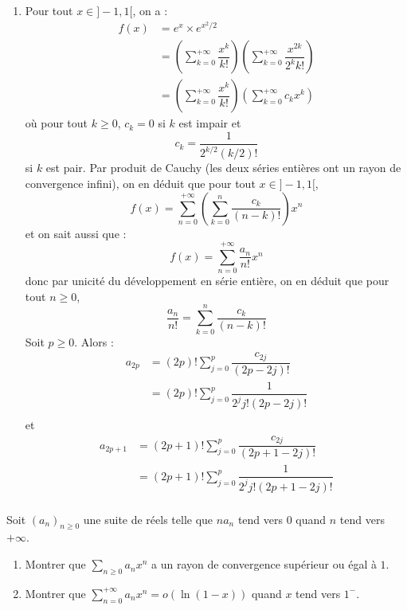 \documentclass[a4paper,twoside,french,11pt]{VcCours}
\begin{document}
\begin{enumerate}
\item Pour tout $x \in ]-1,1[$, on a :
\begin{align*}
f(x) & = e^x \times e^{x^2/2} \\
& = \left( \sum_{k=0}^{+ \infty} \dfrac{x^k}{k!} \right) \left( \sum_{k=0}^{+ \infty} \dfrac{x^{2k}}{2^k k!} \right)  \\
& = \left( \sum_{k=0}^{+ \infty} \dfrac{x^k}{k!} \right) \left( \sum_{k=0}^{+ \infty} c_k x^k \right)  
\end{align*}
où pour tout $k \geq 0$, $c_k=0$ si $k$ est impair et 
$$ c_k = \dfrac{1}{2^{k/2} (k/2)!}$$
si $k$ est pair. Par produit de Cauchy (les deux séries entières ont un rayon de convergence infini), on en déduit que pour tout $x \in ]-1,1[$,
$$ f(x) = \sum_{n=0}^{+ \infty} \left(\sum_{k=0}^n \dfrac{c_k}{(n-k)!} \right) x^n$$
et on sait aussi que :
$$ f(x) = \sum_{n=0}^{+ \infty} \dfrac{a_n}{n!} x^n$$
donc par unicité du développement en série entière, on en déduit que pour tout $n \geq 0$,
$$\dfrac{a_n}{n!} = \sum_{k=0}^n \dfrac{c_k}{(n-k)!}$$
Soit $p \geq 0$. Alors :
\begin{align*}
a_{2p} & = (2p)! \sum_{j=0}^p \dfrac{c_{2j}}{(2p-2j)!} \\
& = (2p)! \sum_{j=0}^p \dfrac{1}{2^j j! (2p-2j)!} \\
\end{align*}
et 
\begin{align*}
a_{2p+1} & = (2p+1)! \sum_{j=0}^p \dfrac{c_{2j}}{(2p+1-2j)!} \\
& = (2p+1)! \sum_{j=0}^p \dfrac{1}{2^j j! (2p+1-2j)!} \\
\end{align*}
\end{enumerate}

\begin{Exercice}[$\bigstar$]{} Soit $(a_n)_{n \geq 0}$ une suite de réels telle que $na_n$ tend vers $0$ quand $n$ tend vers $+ \infty$.
\begin{enumerate}
\item Montrer que $\sum_{n \geq 0} a_n x^n$ a un rayon de convergence supérieur ou égal à $1$.
\item Montrer que $\sum_{n=0}^{+ \infty} a_n x^n = o(\ln(1-x))$ quand $x$ tend vers $1^{-}$.
\end{enumerate}
\end{Exercice}
\end{document}
